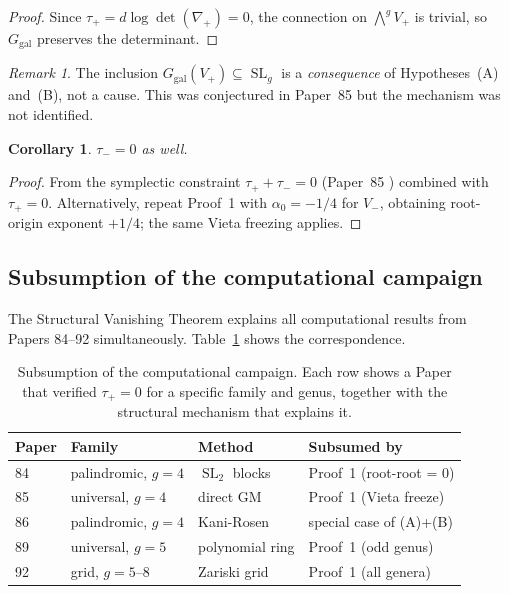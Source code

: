\documentclass[11pt]{article}
\theoremstyle{plain}
\newtheorem{corollary}[theorem]{Corollary}
\theoremstyle{definition}
\theoremstyle{remark}
\newtheorem{remark}[theorem]{Remark}
\newcommand{\SL}{\operatorname{SL}}
\begin{document}
\begin{proof}
  Since $\tau_+ = d\log\det(\nabla_+) = 0$, the connection on
  $\bigwedge^g V_+$ is trivial, so $G_\mathrm{gal}$ preserves the determinant.
\end{proof}

\begin{remark}
  The inclusion $G_\mathrm{gal}(V_+) \subseteq \SL_g$ is a \emph{consequence}
  of Hypotheses~(A) and~(B), not a cause.  This was conjectured in
  Paper~85 \cite{p85} but the mechanism was not identified.
\end{remark}

\begin{corollary}\label{cor:tau-minus}
  $\tau_- = 0$ as well.
\end{corollary}

\begin{proof}
  From the symplectic constraint $\tau_+ + \tau_- = 0$ (Paper~85 \cite{p85})
  combined with $\tau_+ = 0$.  Alternatively, repeat Proof~1 with
  $\alpha_0 = -1/4$ for $V_-$, obtaining root-origin exponent $+1/4$;
  the same Vieta freezing applies.
\end{proof}

\subsection{Subsumption of the computational campaign}

The Structural Vanishing Theorem explains all computational results
from Papers 84--92 simultaneously.  Table~\ref{tab:subsumption} shows
the correspondence.

\begin{table}[ht]
\centering
\begin{tabular}{llll}
\toprule
\textbf{Paper} & \textbf{Family} & \textbf{Method} & \textbf{Subsumed by} \\
\midrule
84 \cite{p84} & palindromic, $g = 4$ & $\SL_2$ blocks &
  Proof~1 (root-root = 0) \\
85 \cite{p85} & universal, $g = 4$ & direct GM &
  Proof~1 (Vieta freeze) \\
86 \cite{p86} & palindromic, $g = 4$ & Kani-Rosen &
  special case of (A)+(B) \\
89 \cite{p89} & universal, $g = 5$ & polynomial ring &
  Proof~1 (odd genus) \\
92 \cite{p92} & grid, $g = 5\text{--}8$ & Zariski grid &
  Proof~1 (all genera) \\
\bottomrule
\end{tabular}
\caption{Subsumption of the computational campaign.  Each row shows
a Paper that verified $\tau_+ = 0$ for a specific family and genus,
together with the structural mechanism that explains it.}
\label{tab:subsumption}
\end{table}
\end{document}
